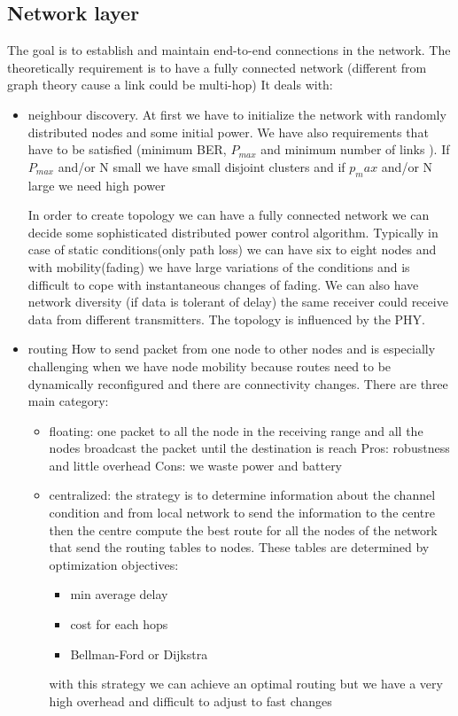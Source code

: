 \subsection{Network layer}
The goal is to establish and maintain end-to-end connections in the network. The theoretically requirement is to have a fully connected network (different from graph theory cause a link could be multi-hop)
It deals with:
\begin{itemize}
	\item neighbour discovery.
	At first we have to initialize the network with randomly distributed nodes and some initial power. We have also requirements that have to be satisfied (minimum BER, $ P_{max} $ and minimum number of links ). If $ P_{max} $ and/or N small we have small disjoint clusters and if $ p_max $ and/or N large we need high power

	In order to create topology we can have a fully connected network we can decide some sophisticated distributed power control algorithm. Typically in case of static conditions(only path loss) we can have six to eight nodes and with mobility(fading) we have large variations of the conditions and is difficult to cope with instantaneous changes of fading. We can also have network diversity (if data is tolerant of delay) the same receiver could receive data from different transmitters. The topology is influenced by the PHY.

	\item routing
	How to send packet from one node to other nodes and is especially challenging when we have node mobility because routes need to be dynamically reconfigured and there are connectivity changes. There are three main category:
	\begin{itemize}
		\item floating: one packet to all the node in the receiving range and all the nodes broadcast the packet until the destination is reach Pros: robustness and little overhead Cons: we waste power and battery
		\item centralized: the strategy is to determine information about the channel condition and from local network to send the information to the centre then the centre compute the best route for all the nodes of the network that send the routing tables to nodes. These tables are determined by optimization objectives:
		\begin{itemize}
			\item min average delay
			\item cost for each hops
			\item Bellman-Ford or Dijkstra
		\end{itemize}
		with this strategy we can achieve an optimal routing but we have a very high overhead and difficult to adjust to fast changes


\end{itemize}
\end{itemize}
